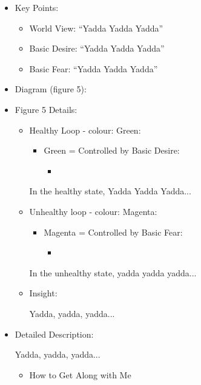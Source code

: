 \documentclass[openleft,oneside,showtrims]{memoir}
\begin{document}
\begin{itemize}
\item Key Points:
\label{sec:org95fa1f5}
\begin{itemize}
\item World View: ``Yadda Yadda Yadda''
\item Basic Desire: ``Yadda Yadda Yadda''
\item Basic Fear: ``Yadda Yadda Yadda''
\end{itemize}

\item Diagram (figure 5):
\label{sec:orgd8484da}

\item Figure 5 Details:
\label{sec:org90765e3}

\begin{itemize}
\item Healthy Loop - colour: Green:
\label{sec:org994e60c}

\begin{itemize}
\item Green = Controlled by Basic Desire:
\begin{itemize}
\item 
\end{itemize}
\end{itemize}

In the healthy state, Yadda Yadda Yadda...

\item Unhealthy loop - colour: Magenta:
\label{sec:orgce88596}

\begin{itemize}
\item Magenta = Controlled by Basic Fear:

\begin{itemize}
\item 
\end{itemize}
\end{itemize}

In the unhealthy state, yadda yadda yadda...

\item Insight:
\label{sec:orgf97b23b}

Yadda, yadda, yadda...
\end{itemize}

\item Detailed Description:
\label{sec:orgb46e49c}

Yadda, yadda, yadda...

\begin{itemize}
\item How to Get Along with Me
\label{sec:org93837bb}


\end{itemize}
\end{itemize}
\end{document}
